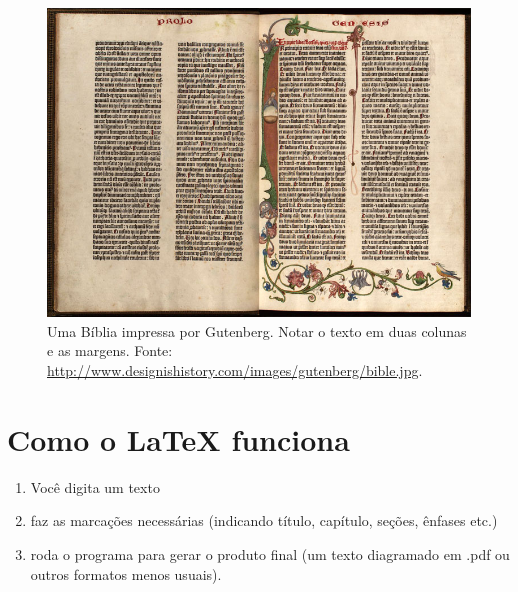 \documentclass[a4paper,nols,bidi,nohyper,nobib]{tufte-book}
\begin{document}


\begin{figure}
\centering
\includegraphics[width=0.8\linewidth]{biblia-gutenberg}
\caption[Uma Bíblia impressa por Gutenberg.]{Uma Bíblia impressa por Gutenberg. Notar o texto em duas colunas e as margens. Fonte: \url{http://www.designishistory.com/images/gutenberg/bible.jpg}.\label{fig:biblia-gutenberg}}
\end{figure}


\section{Como o LaTeX funciona}
 
 \begin{enumerate}
 \item  Você digita um texto \item faz as marcações necessárias (indicando título, capítulo, seções, ênfases etc.) \item  roda o programa para gerar o produto final (um texto diagramado em .pdf ou outros formatos menos usuais).
 \end{enumerate}
\end{document}
